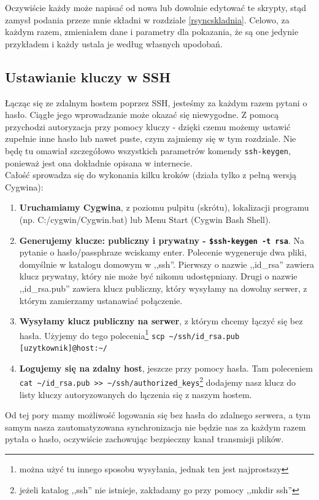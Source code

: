 Oczywiście każdy może napisać od nowa lub dowolnie edytować te skrypty, stąd zamysł podania przeze mnie składni w rozdziale \ref{rsyncskladnia}. Celowo, za każdym razem, zmieniałem dane i parametry dla pokazania, że są one jedynie przykładem i każdy ustala je według własnych upodobań.

\subsection{Ustawianie kluczy w SSH}
Łącząc się ze zdalnym hostem poprzez SSH, jesteśmy za każdym razem pytani o hasło. Ciągłe jego wprowadzanie może okazać się niewygodne. Z pomocą przychodzi autoryzacja przy pomocy kluczy - dzięki czemu możemy ustawić zupełnie inne hasło lub nawet puste, czym zajmiemy się w tym rozdziale. Nie będę tu omawiał szczegółowo wszystkich parametrów komendy \verb|ssh-keygen|, ponieważ jest ona dokładnie opisana w internecie\cite{8}.
\\Całość sprowadza się do wykonania kilku kroków (działa tylko z pełną wersją Cygwina):
\begin{enumerate}
\item {\bf Uruchamiamy Cygwina}, z poziomu pulpitu (skrótu), lokalizacji programu (np. C:/cygwin/Cygwin.bat) lub Menu Start (Cygwin Bash Shell).
\item {\bf Generujemy klucze: publiczny i prywatny - \verb|$ssh-keygen -t rsa|}. Na pytanie o hasło/passphraze wciskamy enter. Polecenie wygeneruje dwa pliki, domyślnie w katalogu domowym w ,,ssh''. Pierwszy o nazwie ,,id\_rsa'' zawiera klucz prywatny, który nie może być nikomu udostępniany. Drugi o nazwie ,,id\_rsa.pub'' zawiera klucz publiczny, który wysyłamy na dowolny serwer, z którym zamierzamy ustanawiać połączenie.

\item {\bf Wysyłamy klucz publiczny na serwer}, z którym chcemy łączyć się bez hasła. Użyjemy do tego polecenia\footnote{można użyć tu innego sposobu wysyłania, jednak ten jest najprostszy} \verb|scp ~/ssh/id_rsa.pub [uzytkownik]@host:~/|

\item {\bf Logujemy się na zdalny host}, jeszcze przy pomocy hasła. Tam poleceniem \verb|cat ~/id_rsa.pub >> ~/ssh/authorized_keys|\footnote{jeżeli katalog ,,ssh'' nie istnieje, zakładamy go przy pomocy ,,mkdir ssh''} dodajemy nasz klucz do listy kluczy autoryzowanych do łączenia się z naszym hostem.
\end{enumerate}
Od tej pory mamy możliwość logowania się bez hasła do zdalnego serwera, a tym samym nasza zautomatyzowana synchronizacja nie będzie nas za każdym razem pytała o hasło, oczywiście zachowując bezpieczny kanał transmisji plików.

